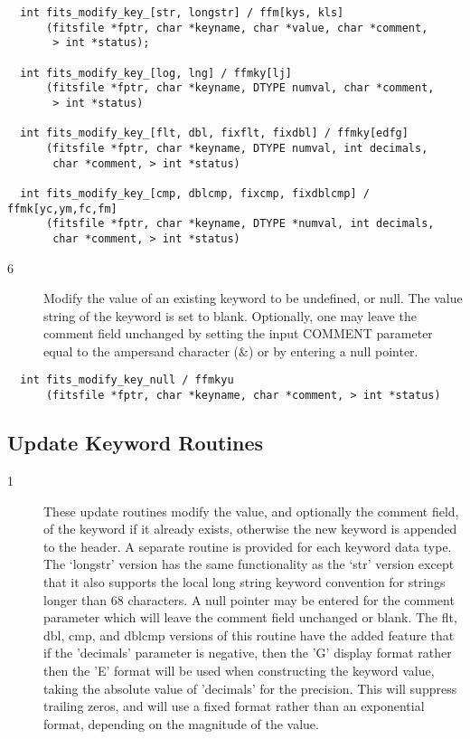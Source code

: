 \documentclass[11pt]{book}
\begin{document}
\begin{verbatim}
  int fits_modify_key_[str, longstr] / ffm[kys, kls]
      (fitsfile *fptr, char *keyname, char *value, char *comment,
       > int *status);

  int fits_modify_key_[log, lng] / ffmky[lj]
      (fitsfile *fptr, char *keyname, DTYPE numval, char *comment,
       > int *status)

  int fits_modify_key_[flt, dbl, fixflt, fixdbl] / ffmky[edfg]
      (fitsfile *fptr, char *keyname, DTYPE numval, int decimals,
       char *comment, > int *status)

  int fits_modify_key_[cmp, dblcmp, fixcmp, fixdblcmp] / ffmk[yc,ym,fc,fm]
      (fitsfile *fptr, char *keyname, DTYPE *numval, int decimals,
       char *comment, > int *status)
\end{verbatim}

\begin{description}
\item[6 ] Modify the value of an existing keyword to be undefined, or null.
    The value string of the keyword is set to blank.
    Optionally, one may leave the comment field unchanged by setting the
    input COMMENT parameter equal to
   the ampersand character (\&) or by entering a null pointer.  \label{ffmkyu}
\end{description}

\begin{verbatim}
  int fits_modify_key_null / ffmkyu
      (fitsfile *fptr, char *keyname, char *comment, > int *status)
\end{verbatim}

\subsection{Update Keyword Routines}


\begin{description}
\item[1 ] These update routines modify the value, and optionally the comment field,
    of the keyword if it already exists, otherwise the new keyword is
    appended to the header.  A separate routine is provided for each
    keyword data type.  The `longstr' version has the same functionality
    as the `str' version except that it also supports the local long
    string keyword convention for strings longer than 68 characters.  A
    null pointer may be entered for the comment parameter which will
    leave the comment field unchanged or blank.  The flt, dbl, cmp, and
    dblcmp versions of this routine have the added feature that if the
    'decimals' parameter is negative, then the 'G' display format
    rather then the 'E' format will be used when constructing the
    keyword value, taking the absolute value of 'decimals' for the
    precision.  This will suppress trailing zeros, and will use a fixed
    format rather than an exponential format,
   depending on the magnitude of the value. \label{ffukyx}
\end{description}
\end{document}
